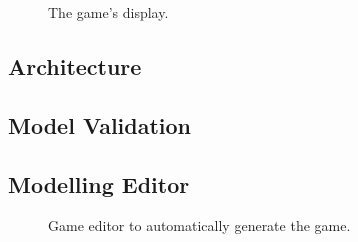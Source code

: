 \documentclass[runningheads,a4paper]{llncs}
\begin{document}
\begin{figure}[htb]
\centering
{}
\caption{The game's display.}
\end{figure}

\subsection{Architecture}

\subsection{Model Validation}

\subsection{Modelling Editor}

\begin{figure}[htb]
\centering
{}
\caption{Game editor to automatically generate the game.}
\end{figure}
\end{document}
